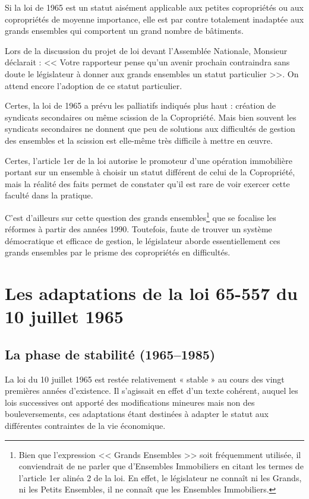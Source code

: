 			Si la loi de 1965 est un statut aisément applicable aux petites copropriétés ou aux copropriétés de moyenne importance, elle est par contre totalement inadaptée aux grands ensembles qui comportent un grand nombre de bâtiments.
			
			Lors de la discussion du projet de loi devant l'Assemblée Nationale, Monsieur  déclarait : << Votre rapporteur pense qu'un avenir prochain contraindra sans doute le législateur à donner aux grands ensembles un statut particulier >>. On attend encore l'adoption de ce statut particulier.
			
			Certes, la loi de 1965 a prévu les palliatifs indiqués plus haut : création de syndicats secondaires ou même scission de la Copropriété. Mais bien souvent les syndicats secondaires ne donnent que peu de solutions aux difficultés de gestion des ensembles et la scission est elle-même très difficile à mettre en œuvre.
			
			Certes, l'article 1er de la loi autorise le promoteur d'une opération immobilière portant sur un ensemble à choisir un statut différent de celui de la Copropriété, mais la réalité des faits permet de constater qu'il est rare de voir exercer cette faculté dans la pratique.
			
			C'est d'ailleurs sur cette question des grands ensembles\footnote{Bien que l'expression << Grands Ensembles >> soit fréquemment utilisée, il conviendrait de ne parler que d'Ensembles Immobiliers en citant les termes de l'article 1er alinéa 2 de la loi. En effet, le législateur ne connaît ni les Grands, ni les Petits Ensembles, il ne connaît que les Ensembles Immobiliers.} que se focalise les réformes à partir des années 1990. Toutefois, faute de trouver un système démocratique et efficace de gestion, le législateur aborde essentiellement ces grands ensembles par le prisme des copropriétés en difficultés.
	
	
	\section{Les adaptations de la loi 65-557 du 10 juillet 1965}
	
		\subsection{La phase de stabilité (1965--1985)}
			La loi du 10 juillet 1965 est restée relativement « stable » au cours des vingt premières années d’existence. Il s’agissait en effet d’un texte cohérent, auquel les lois successives ont apporté des modifications mineures mais non des bouleversements, ces adaptations étant destinées à adapter le statut aux différentes contraintes de la vie économique.
			
